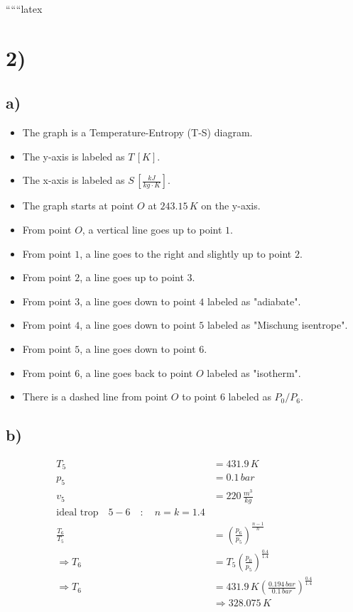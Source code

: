 
``````latex


\section*{2)}

\subsection*{a)}

\begin{itemize}
    \item The graph is a Temperature-Entropy (T-S) diagram.
    \item The y-axis is labeled as $T \, [K]$.
    \item The x-axis is labeled as $S \, [\frac{kJ}{kg \cdot K}]$.
    \item The graph starts at point $O$ at $243.15 \, K$ on the y-axis.
    \item From point $O$, a vertical line goes up to point $1$.
    \item From point $1$, a line goes to the right and slightly up to point $2$.
    \item From point $2$, a line goes up to point $3$.
    \item From point $3$, a line goes down to point $4$ labeled as "adiabate".
    \item From point $4$, a line goes down to point $5$ labeled as "Mischung isentrope".
    \item From point $5$, a line goes down to point $6$.
    \item From point $6$, a line goes back to point $O$ labeled as "isotherm".
    \item There is a dashed line from point $O$ to point $6$ labeled as $P_0/P_6$.
\end{itemize}

\subsection*{b)}

\begin{align*}
    T_5 &= 431.9 \, K \\
    p_5 &= 0.1 \, bar \\
    v_5 &= 220 \, \frac{m^3}{kg} \\
    \text{ideal trop} \quad 5-6 \quad : \quad n = k = 1.4 \\
    \frac{T_6}{T_5} &= \left( \frac{p_6}{p_5} \right)^{\frac{n-1}{n}} \\
    \Rightarrow T_6 &= T_5 \left( \frac{p_0}{p_5} \right)^{\frac{0.4}{1.4}} \\
    \Rightarrow T_6 &= 431.9 \, K \left( \frac{0.194 \, bar}{0.1 \, bar} \right)^{\frac{0.4}{1.4}} \\
    &\Rightarrow 328.075 \, K
\end{align*}

